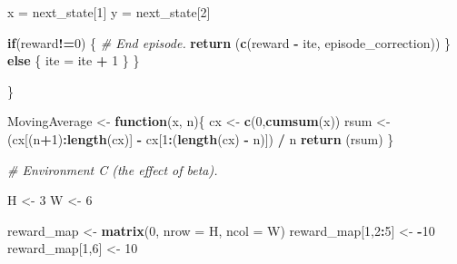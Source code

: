 \documentclass[
]{article}
\newenvironment{Shaded}{\begin{snugshade}}{\end{snugshade}}
\newcommand{\AttributeTok}[1]{\textcolor[rgb]{0.13,0.29,0.53}{#1}}
\newcommand{\CommentTok}[1]{\textcolor[rgb]{0.56,0.35,0.01}{\textit{#1}}}
\newcommand{\ControlFlowTok}[1]{\textcolor[rgb]{0.13,0.29,0.53}{\textbf{#1}}}
\newcommand{\DecValTok}[1]{\textcolor[rgb]{0.00,0.00,0.81}{#1}}
\newcommand{\FunctionTok}[1]{\textcolor[rgb]{0.13,0.29,0.53}{\textbf{#1}}}
\newcommand{\NormalTok}[1]{#1}
\newcommand{\OtherTok}[1]{\textcolor[rgb]{0.56,0.35,0.01}{#1}}
\newcommand{\SpecialCharTok}[1]{\textcolor[rgb]{0.81,0.36,0.00}{\textbf{#1}}}
\begin{document}
\begin{Shaded}
\begin{Highlighting}[]
\NormalTok{    x }\OtherTok{=}\NormalTok{ next\_state[}\DecValTok{1}\NormalTok{]}
\NormalTok{    y }\OtherTok{=}\NormalTok{ next\_state[}\DecValTok{2}\NormalTok{]}

    \ControlFlowTok{if}\NormalTok{(reward}\SpecialCharTok{!=}\DecValTok{0}\NormalTok{) \{}
      \CommentTok{\# End episode.}
      \FunctionTok{return}\NormalTok{ (}\FunctionTok{c}\NormalTok{(reward }\SpecialCharTok{{-}}\NormalTok{ ite, episode\_correction))}
\NormalTok{    \}}
    \ControlFlowTok{else}\NormalTok{ \{}
\NormalTok{      ite }\OtherTok{=}\NormalTok{ ite }\SpecialCharTok{+} \DecValTok{1}
\NormalTok{    \}}
\NormalTok{  \}}

\NormalTok{\}}



\NormalTok{MovingAverage }\OtherTok{\textless{}{-}} \ControlFlowTok{function}\NormalTok{(x, n)\{}
\NormalTok{  cx }\OtherTok{\textless{}{-}} \FunctionTok{c}\NormalTok{(}\DecValTok{0}\NormalTok{,}\FunctionTok{cumsum}\NormalTok{(x))}
\NormalTok{  rsum }\OtherTok{\textless{}{-}}\NormalTok{ (cx[(n}\SpecialCharTok{+}\DecValTok{1}\NormalTok{)}\SpecialCharTok{:}\FunctionTok{length}\NormalTok{(cx)] }\SpecialCharTok{{-}}\NormalTok{ cx[}\DecValTok{1}\SpecialCharTok{:}\NormalTok{(}\FunctionTok{length}\NormalTok{(cx) }\SpecialCharTok{{-}}\NormalTok{ n)]) }\SpecialCharTok{/}\NormalTok{ n}
  \FunctionTok{return}\NormalTok{ (rsum)}
\NormalTok{\}}


\CommentTok{\# Environment C (the effect of beta).}

\NormalTok{H }\OtherTok{\textless{}{-}} \DecValTok{3}
\NormalTok{W }\OtherTok{\textless{}{-}} \DecValTok{6}

\NormalTok{reward\_map }\OtherTok{\textless{}{-}} \FunctionTok{matrix}\NormalTok{(}\DecValTok{0}\NormalTok{, }\AttributeTok{nrow =}\NormalTok{ H, }\AttributeTok{ncol =}\NormalTok{ W)}
\NormalTok{reward\_map[}\DecValTok{1}\NormalTok{,}\DecValTok{2}\SpecialCharTok{:}\DecValTok{5}\NormalTok{] }\OtherTok{\textless{}{-}} \SpecialCharTok{{-}}\DecValTok{10}
\NormalTok{reward\_map[}\DecValTok{1}\NormalTok{,}\DecValTok{6}\NormalTok{] }\OtherTok{\textless{}{-}} \DecValTok{10}


\end{Highlighting}
\end{Shaded}
\end{document}

